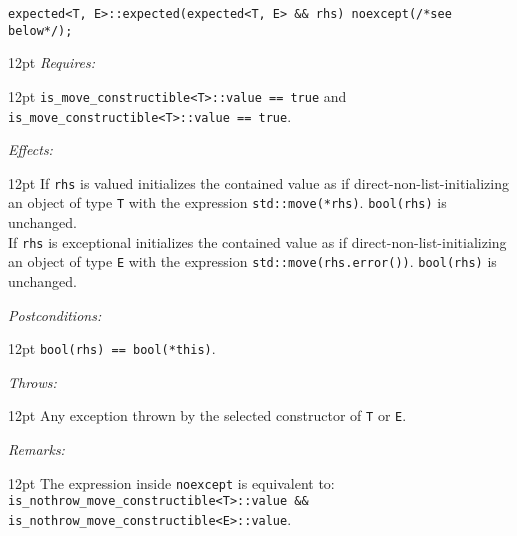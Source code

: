 \documentclass[a4paper,10pt]{article}
\newcommand{\cpp}[1]{\lstinline{#1}}
\newcommand{\wordingItem}[1]{\noindent\textit{#1:}}
\newenvironment{wordingTextItem}[1]{\wordingItem{#1}\vspace{7pt}\noindent\begin{adjustwidth}{12pt}{}}{\vspace{7pt}\end{adjustwidth}}
\newenvironment{wordingPara}{\begin{adjustwidth}{12pt}{}}{\end{adjustwidth}}
\begin{document}
\begin{lstlisting}[xleftmargin=0pt]
expected<T, E>::expected(expected<T, E> && rhs) noexcept(/*see below*/);
\end{lstlisting}
\begin{wordingPara}
\begin{wordingTextItem}{Requires}
\cpp{is_move_constructible<T>::value == true} and \\
\cpp{is_move_constructible<T>::value == true}.
\end{wordingTextItem}
\begin{wordingTextItem}{Effects}
If \cpp{rhs} is valued initializes the contained value as if direct-non-list-initializing an object of type \cpp{T} with the expression \cpp{std::move(*rhs)}. \cpp{bool(rhs)} is unchanged.\\

\noindent
If \cpp{rhs} is exceptional initializes the contained value as if direct-non-list-initializing an object of type \cpp{E} with the expression \cpp{std::move(rhs.error())}. \cpp{bool(rhs)} is unchanged.
\end{wordingTextItem}
\begin{wordingTextItem}{Postconditions}
\cpp{bool(rhs) == bool(*this)}.
\end{wordingTextItem}
\begin{wordingTextItem}{Throws}
Any exception thrown by the selected constructor of \cpp{T} or \cpp{E}.
\end{wordingTextItem}
\begin{wordingTextItem}{Remarks}
The expression inside \cpp{noexcept} is equivalent to:\\
\cpp{is_nothrow_move_constructible<T>::value && is_nothrow_move_constructible<E>::value}.
\end{wordingTextItem}
\end{wordingPara}
\end{document}
